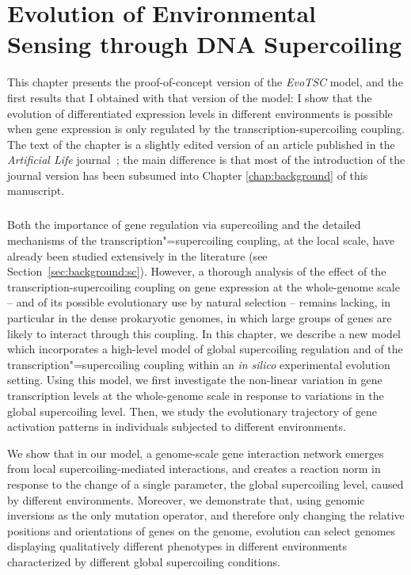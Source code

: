 \chapter{Evolution of Environmental Sensing through DNA Supercoiling}
\label{chap:alife}

This chapter presents the proof-of-concept version of the \emph{EvoTSC} model, and the first results that I obtained with that version of the model: I show that the evolution of differentiated expression levels in different environments is possible when gene expression is only regulated by the transcription-supercoiling coupling.
The text of the chapter is a slightly edited version of an article published in the \emph{Artificial Life} journal~\citep{grohens2022a}; the main difference is that most of the introduction of the journal version has been subsumed into Chapter \ref{chap:background} of this manuscript.

\paragraph{}
Both the importance of gene regulation via supercoiling and the detailed mechanisms of the transcription"=supercoiling coupling, at the local scale, have already been studied extensively in the literature (see Section~\ref{sec:background:sc}).
However, a thorough analysis of the effect of the transcription-supercoiling coupling on gene expression at the whole-genome scale -- and of its possible evolutionary use by natural selection -- remains lacking, in particular in the dense prokaryotic genomes, in which large groups of genes are likely to interact through this coupling.
In this chapter, we describe a new model which incorporates a high-level model of global supercoiling regulation and of the transcription"=supercoiling coupling within an \emph{in silico} experimental evolution setting.
Using this model, we first investigate the non-linear variation in gene transcription levels at the whole-genome scale in response to variations in the global supercoiling level.
Then, we study the evolutionary trajectory of gene activation patterns in individuals subjected to different environments.

We show that in our model, a genome-scale gene interaction network emerges from local supercoiling-mediated interactions, and creates a reaction norm in response to the change of a single parameter, the global supercoiling level, caused by different environments.
Moreover, we demonstrate that, using genomic inversions as the only mutation operator, and therefore only changing the relative positions and orientations of genes on the genome, evolution can select genomes displaying qualitatively different phenotypes in different environments characterized by different global supercoiling conditions.

